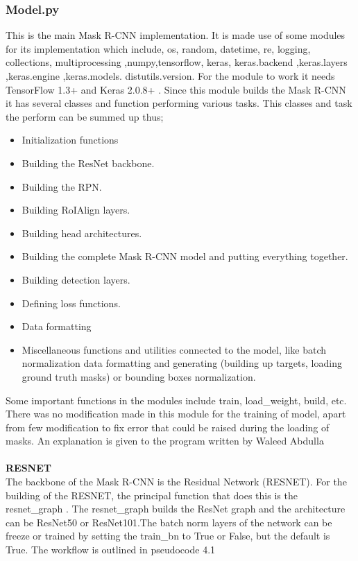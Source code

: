  \subsubsection{Model.py}
 This is the main Mask R-CNN implementation. It is made use of some modules for its implementation which include, os, random, datetime, re, logging, collections, multiprocessing ,numpy,tensorflow, keras, keras.backend ,keras.layers ,keras.engine  ,keras.models. distutils.version. For the module to work it needs TensorFlow 1.3+ and Keras 2.0.8+ .  Since this module builds the Mask R-CNN it has several classes and function performing various tasks. This classes and task the perform can be summed up thus;
 \begin{itemize}
   \item 	Initialization functions
   \item Building the ResNet backbone.
   \item Building the RPN.
   \item Building RoIAlign layers.
   \item Building head architectures.
   \item Building the complete Mask R-CNN model and putting everything together.
   \item Building detection layers.
   \item Defining loss functions.
   \item	Data formatting
   \item Miscellaneous functions and utilities connected to the model, like batch normalization data formatting and generating (building up targets, loading ground truth masks) or bounding boxes normalization.
   
 \end{itemize}
 Some important functions in the modules include train, load\_weight, build, etc. There was no modification made in this module for the training of model, apart from few modification to fix error that could be raised during the loading of masks. An explanation is given to the program written by Waleed Abdulla
\\ 
\\
\textbf{ RESNET}
\\
 The backbone of the Mask R-CNN is the Residual Network (RESNET). For the building of the RESNET, the principal function that does this is the resnet\_graph . The  resnet\_graph builds the ResNet graph and the  architecture can be ResNet50 or ResNet101.The batch norm layers of the network can be freeze or trained by setting the train\_bn to True or False, but the default is True. The workflow is outlined in pseudocode 4.1
 \\
\\

